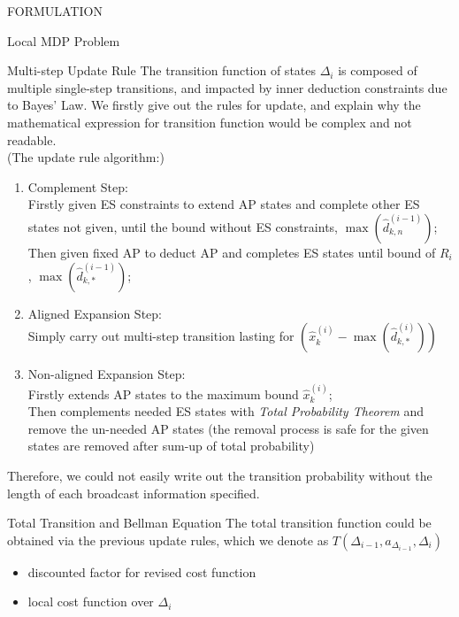 \documentclass[10pt, conference, letterpaper]{IEEEtran}
\begin{document}
\begin{section}{FORMULATION}
\begin{subsection}{Local MDP Problem}
\begin{subsubsection}{Multi-step Update Rule}
                The transition function of states $\Delta_i$ is composed of multiple single-step transitions, and impacted by inner deduction constraints due to Bayes' Law. We firstly give out the rules for update, and explain why the mathematical expression for transition function would be complex and not readable.
                \\
                (The update rule algorithm:)
                \begin{enumerate}
                    \item Complement Step: \\
                    Firstly given ES constraints to extend AP states and complete other ES states not given, until the bound without ES constraints, $\max(\hat{d}_{k,n}^{(i-1)})$;\\
                    Then given fixed AP to deduct AP and completes ES states until bound of $R_i$, $\max(\hat{d}^{(i-1)}_{k,*})$;
                    \item Aligned Expansion Step: \\
                    Simply carry out multi-step transition lasting for $( \hat{x}^{(i)}_k - \max(\hat{d}^{(i)}_{k,*}) )$
                    \item Non-aligned Expansion Step: \\
                    Firstly extends AP states to the maximum bound $\hat{x}^{(i)}_k$; \\
                    Then complements needed ES states with \emph{Total Probability Theorem} and remove the un-needed AP states (the removal process is safe for the given states are removed after sum-up of total probability)
                \end{enumerate}
                Therefore, we could not easily write out the transition probability without the length of each broadcast information specified.
            \end{subsubsection}

            \begin{subsubsection}{Total Transition and Bellman Equation}
                The total transition function could be obtained via the previous update rules, which we denote as $T(\Delta_{i-1}, a_{\Delta_{i-1}}, \Delta_{i})$
                \begin{itemize}
                    \item discounted factor for revised cost function
                    \item local cost function over $\Delta_i$
                \end{itemize}
            \end{subsubsection}


\end{subsection}
\end{section}
\end{document}
